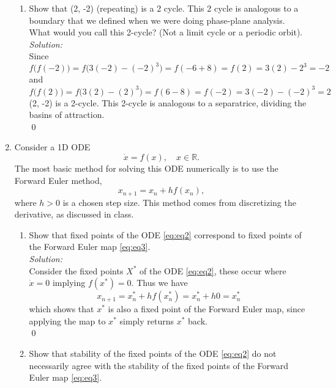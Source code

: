 \documentclass[10pt]{amsart}
\theoremstyle{nonumberplain}
\begin{document}
\begin{enumerate}[label={\bf {\arabic*}:}]
\begin{enumerate}
\item Show that (2, -2) (repeating) is a 2 cycle.
This 2 cycle is analogous to a boundary that we defined when we were doing phase-plane analysis.
What would you call this 2-cycle? (Not a limit cycle or a periodic orbit). \\

\textit{Solution:} \\
Since
$$f\Big(f(-2)\Big) = f\Big(3(-2) - (-2)^3\Big) = f(-6 + 8) = f(2) = 3(2) - 2^3 = -2$$
and
$$f\Big(f(2)\Big) = f\Big(3(2) - (2)^3\Big) = f(6 - 8) = f(-2) = 3(-2) - (-2)^3 = 2$$
(2, -2) is a 2-cycle.
This 2-cycle is analogous to a separatrice, dividing the basins of attraction. \\
\qed \\
\newpage

\end{enumerate}

\item Consider a 1D ODE
\begin{equation}
\dot x = f(x), \quad x \in \mathbb R.
\label{eq:eq2}
\end{equation}
The most basic method for solving this ODE numerically is to use the Forward Euler method,
\begin{equation}
x_{n + 1} = x_n + hf(x_n),
\label{eq:eq3}
\end{equation}
where $h > 0$ is a chosen step size.
This method comes from discretizing the derivative, as discussed in class. \\

\begin{enumerate}
\item Show that fixed points of the ODE \eqref{eq:eq2} correspond to fixed points of the Forward Euler map \eqref{eq:eq3}. \\

\textit{Solution:} \\
Consider the fixed points $X^*$ of the ODE \eqref{eq:eq2}, these occur where $\dot x = 0$ implying $f(x^*) = 0$.
Thus we have
$$
x_{n + 1} = x_n^* + hf(x_n^*) = x_n^* + h 0 = x_n^*
$$
which shows that $x^*$ is also a fixed point of the Forward Euler map, since applying the map to $x^*$ simply returns $x^*$ back. \\
\qed \\

\item Show that stability of the fixed points of the ODE \eqref{eq:eq2} do not necessarily agree with the stability of the fixed points of the Forward Euler map \eqref{eq:eq3}. \\


\end{enumerate}
\end{enumerate}
\end{document}
